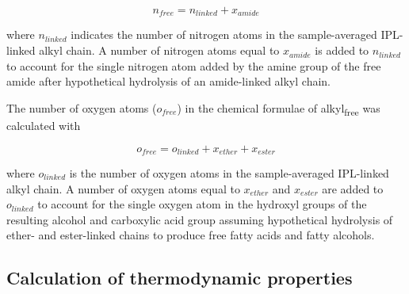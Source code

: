 \begin{equation}
    n_{free} = n_{linked} + x_{amide}
\end{equation}

\noindent where $n_{linked}$ indicates the number of nitrogen atoms in the sample-averaged IPL-linked alkyl chain. A number of nitrogen atoms equal to $x_{amide}$ is added to $n_{linked}$ to account for the single nitrogen atom added by the amine group of the free amide after hypothetical hydrolysis of an amide-linked alkyl chain.

The number of oxygen atoms ($o_{free}$) in the chemical formulae of alkyl\textsubscript{free} was calculated with

\begin{equation}
    o_{free} = o_{linked} + x_{ether} + x_{ester}
\end{equation}

\noindent where $o_{linked}$ is the number of oxygen atoms in the sample-averaged IPL-linked alkyl chain. A number of oxygen atoms equal to $x_{ether}$ and $x_{ester}$ are added to $o_{linked}$ to account for the single oxygen atom in the hydroxyl groups of the resulting alcohol and carboxylic acid group assuming hypothetical hydrolysis of ether- and ester-linked chains to produce free fatty acids and fatty alcohols.

\subsection{Calculation of thermodynamic properties}

